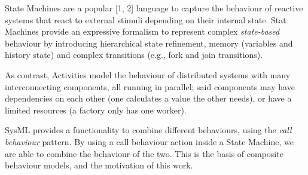 State Machines are a popular [1, 2] language to capture the behaviour
of reactive systems\cite{HAREL1987231} that react to external stimuli depending on
their internal state. Stat Machines provide an expressive formalism to
represent complex \emph{state-based} behaviour by introducing hierarchical
state refinement, memory (variables and history state) and complex
transitions (e.g., fork and join transitions).

As contrast, Activities model the behaviour of distributed systems with many interconnecting components, all running in parallel; said components may have dependencies on each other (one calculates a value the other needs), or have a limited resources (a factory only has one worker).

SysML provides a functionality to combine different behaviours, using the \emph{call behaviour} pattern. By using a call behaviour action inside a State Machine, we are able to combine the behaviour of the two. This is the basis of composite behaviour models, and the motivation of this work. 
